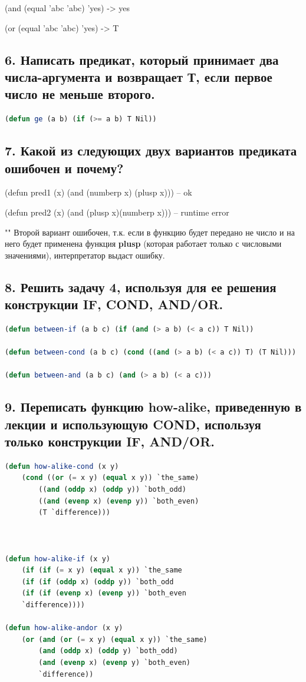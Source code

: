 \documentclass[12pt]{report}
\begin{document}
(and (equal 'abc 'abc) 'yes) -> yes

(or (equal 'abc 'abc) 'yes) -> T

\subsection*{6. Написать предикат, который принимает два числа-аргумента и возвращает
	Т, если первое число не меньше второго.}

\begin{lstlisting}[label=6xd, caption=Решение задания №6, language=lisp]
(defun ge (a b) (if (>= a b) T Nil))
\end{lstlisting}

\subsection*{7. Какой из следующих двух вариантов предиката ошибочен и почему?}

(defun pred1 (x) (and (numberp x) (plusp x))) -- ok

(defun pred2 (x) (and (plusp x)(numberp x))) -- runtime error

""\newline
Второй вариант ошибочен, т.к. если в функцию будет передано не число и на него будет применена функция \textbf{plusp} (которая работает только с числовыми значениями), интерпретатор выдаст ошибку.

\subsection*{8. Решить задачу 4, используя для ее решения конструкции
	IF, COND, AND/OR.}

\begin{lstlisting}[label=6xd, caption=Решение задания №8, language=lisp]
(defun between-if (a b c) (if (and (> a b) (< a c)) T Nil))

(defun between-cond (a b c) (cond ((and (> a b) (< a c)) T) (T Nil)))

(defun between-and (a b c) (and (> a b) (< a c)))
\end{lstlisting}

\subsection*{9. Переписать функцию how-alike, приведенную в лекции и использующую COND, используя
	только конструкции IF, AND/OR.}

\begin{lstlisting}[label=6xd, caption=Решение задания №9, language=lisp]
(defun how-alike-cond (x y)
	(cond ((or (= x y) (equal x y)) `the_same)
		((and (oddp x) (oddp y)) `both_odd)
		((and (evenp x) (evenp y)) `both_even)
		(T `difference)))



(defun how-alike-if (x y)
	(if (if (= x y) (equal x y)) `the_same 
	(if (if (oddp x) (oddp y)) `both_odd 
	(if (if (evenp x) (evenp y)) `both_even 
	`difference))))

(defun how-alike-andor (x y)
	(or (and (or (= x y) (equal x y)) `the_same)
		(and (oddp x) (oddp y) `both_odd)
		(and (evenp x) (evenp y) `both_even) 
		`difference))
\end{lstlisting}
\end{document}
